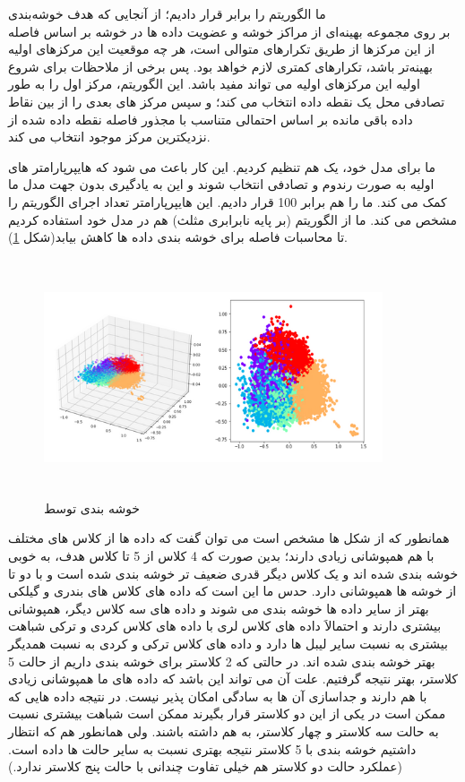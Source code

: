 \documentclass[12pt,onecolumn,a4paper]{article}
\begin{document}
ما الگوریتم  را برابر  قرار دادیم؛ از آنجایی که هدف خوشه‌بندی \\  بر روی مجموعه بهینه‌ای از مراکز خوشه و عضویت داده ها در خوشه بر اساس فاصله از این مرکزها از طریق تکرارهای متوالی است، هر چه موقعیت‌ این مرکزهای اولیه بهینه‌تر باشد، تکرارهای کمتری لازم خواهد بود. پس برخی از ملاحظات برای شروع اولیه این مرکزهای اولیه می تواند مفید باشد. این الگوریتم، مرکز اول را به طور تصادفی محل یک نقطه داده انتخاب می کند؛ و سپس مرکز های بعدی را از بین نقاط داده باقی مانده بر اساس احتمالی متناسب با مجذور فاصله نقطه داده شده از نزدیکترین مرکز موجود انتخاب می کند.

ما برای مدل خود، یک  هم تنظیم کردیم. این کار باعث می شود که هایپرپارامتر های اولیه به صورت رندوم و تصادفی انتخاب شوند و این به یادگیری بدون جهت مدل ما کمک می کند.
ما  را هم برابر 100 قرار دادیم. این هایپرپارامتر تعداد اجرای الگوریتم را مشخص می کند. ما از الگوریتم  (بر پایه نابرابری مثلث) هم در مدل خود استفاده کردیم تا محاسبات فاصله برای خوشه بندی داده ها کاهش بیابد(شکل \ref{fig:KMeans}).

\begin{figure}
  \centering
  \includegraphics[width=10cm,height=7cm,keepaspectratio]{18.png}
  \caption{خوشه بندی توسط }
  \label{fig:KMeans}
\end{figure}

همانطور که از شکل ها مشخص است می توان گفت که داده ها از کلاس های مختلف با هم همپوشانی زیادی دارند؛ بدین صورت که 4 کلاس از 5 تا کلاس هدف، به خوبی خوشه بندی شده اند و یک کلاس دیگر قدری ضعیف تر خوشه بندی شده است و با دو تا از خوشه ها همپوشانی دارد. حدس ما این است که داده های کلاس های بندری و گیلکی بهتر از سایر داده ها خوشه بندی می شوند و داده های سه کلاس دیگر، همپوشانی بیشتری دارند و احتمالاَ داده های کلاس لری با داده های کلاس کردی و ترکی شباهت بیشتری به نسبت سایر لیبل ها دارد و داده های کلاس ترکی و کردی به نسبت همدیگر بهتر خوشه بندی شده اند. در حالتی که 2 کلاستر برای خوشه بندی داریم از حالت 5 کلاستر، بهتر نتیجه گرفتیم. علت آن می تواند این باشد که داده های ما همپوشانی زیادی با هم دارند و جداسازی آن ها به سادگی امکان پذیر نیست. در نتیجه داده هایی که ممکن است در یکی از این دو کلاستر قرار بگیرند ممکن است شباهت بیشتری نسبت به حالت سه کلاستر و چهار کلاستر، به هم داشته باشند. ولی همانطور هم که انتظار داشتیم خوشه بندی با 5 کلاستر نتیجه بهتری نسبت به سایر حالت ها داده است. (عملکرد حالت دو کلاستر هم خیلی تفاوت چندانی با حالت پنج کلاستر ندارد.)
\end{document}

